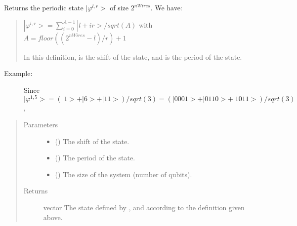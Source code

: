 \documentclass[letterpaper,10pt,english]{sphinxmanual}
\begin{document}
\begin{fulllineitems}
\label{\detokenize{QFT:mermin_on_qiskit.QFT.periodic_state}}
Returns the periodic state \(|\varphi^{l,r}>\) of size \(2^{nWires}\). We have:
\begin{quote}

\(|\varphi^{l,r}> = \sum_{i=0}^{A-1}|l+ir>/sqrt(A)\) with
\(A = floor((2^{nWires}-l)/r)+1\)

In this definition,  is the shift of the state, and  is the period 
of the state.
\end{quote}
\begin{description}
\item[{Example:}] \leavevmode
Since
\(|\varphi^{1,5}> = (|1>+|6>+|11>)/sqrt(3)=(|0001>+|0110>+|1011>)/sqrt(3)\),

\begin{sphinxVerbatim}[commandchars=\\\{\}]
\end{sphinxVerbatim}

\end{description}
\begin{quote}\begin{description}
\item[{Parameters}] \leavevmode\begin{itemize}
\item {} 
 () \textendash{} The shift of the state.

\item {} 
 () \textendash{} The period of the state.

\item {} 
 () \textendash{} The size of the system (number of qubits).

\end{itemize}

\item[{Returns}] \leavevmode
vector \textendash{} The state defined by ,  and  according
to the definition given above.

\end{description}\end{quote}

\end{fulllineitems}
\end{document}
